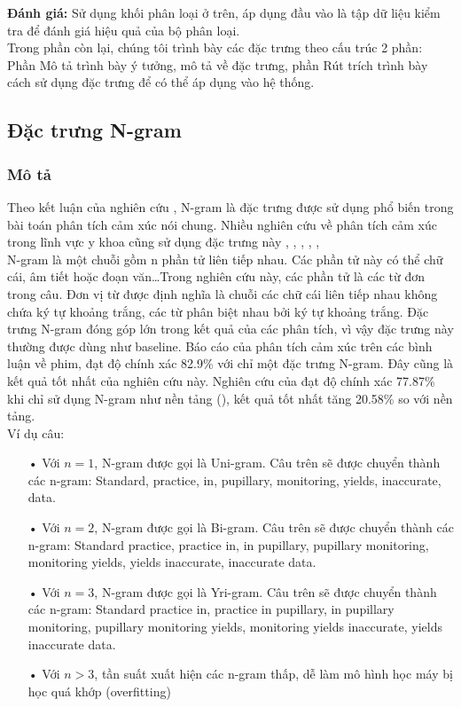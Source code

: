 \textbf{Đánh giá:} Sử dụng khối phân loại ở trên, áp dụng đầu vào là tập dữ liệu kiểm tra để đánh giá hiệu quả của bộ phân loại.\\

Trong phần còn lại, chúng tôi trình bày các đặc trưng theo cấu trúc 2 phần: Phần Mô tả trình bày ý tưởng, mô tả về đặc trưng, phần Rút trích trình bày cách sử dụng đặc trưng để có thể áp dụng vào hệ thống.


\subsection{Đặc trưng N-gram} \label{sec:ngram}
\subsubsection*{Mô tả}
Theo kết luận của nghiên cứu \cite{chandrakala2012opinion}, N-gram là đặc trưng được sử dụng phổ biến trong bài toán phân tích cảm xúc nói chung. Nhiều nghiên cứu về phân tích cảm xúc trong lĩnh vực y khoa cũng sử dụng đặc trưng này \cite{pang2002thumbs}, \cite{niu2005analysis}, \cite{sarker2011outcome}, \cite{niu2006using}, \cite{pestian2012sentie}, \cite{xia09improving} \\

N-gram là một chuỗi gồm n phần tử liên tiếp nhau. Các phần tử này có thể chữ cái, âm tiết hoặc đoạn văn\ldots Trong nghiên cứu này, các phần tử là các từ đơn trong câu. Đơn vị từ được định nghĩa là chuỗi các chữ cái liên tiếp nhau không chứa ký tự khoảng trắng, các từ phân biệt nhau bởi ký tự khoảng trắng. Đặc trưng N-gram đóng góp lớn trong kết quả của các phân tích, vì vậy đặc trưng này thường được dùng như baseline. Báo cáo  của \cite{pang2002thumbs} phân tích cảm xúc trên các bình luận về phim, đạt độ chính xác 82.9\% với chỉ một đặc trưng N-gram. Đây cũng là kết quả tốt nhất của nghiên cứu này. Nghiên cứu của \cite{niu2005analysis} đạt độ chính xác 77.87\% khi chỉ sử dụng N-gram như nền tảng (), kết quả tốt nhất tăng 20.58\% so với nền tảng.\\

Ví dụ câu: 
\begin{itemize}
\item[•]Với $n=1$, N-gram được gọi là Uni-gram. Câu trên sẽ được chuyển thành các n-gram: Standard, practice, in, pupillary, monitoring, yields, inaccurate, data.
\item[•]Với $n=2$, N-gram được gọi là Bi-gram. Câu trên sẽ được chuyển thành các n-gram: Standard practice, practice in, in pupillary, pupillary monitoring, monitoring yields, yields inaccurate, inaccurate data.
\item[•]Với $n=3$, N-gram được gọi là Yri-gram. Câu trên sẽ được chuyển thành các n-gram: Standard practice in, practice in pupillary, in pupillary monitoring, pupillary monitoring yields, monitoring yields inaccurate, yields inaccurate data.
\item[•]Với $n>3$, tần suất xuất hiện các n-gram thấp, dễ làm mô hình học máy bị học quá khớp (overfitting)
\end{itemize}
	
